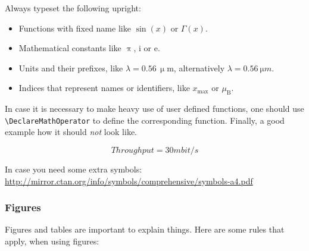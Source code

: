 Always typeset the following upright:

\begin{itemize}
\item Functions with fixed name like $\sin(x)$ or $\Gamma (x)$.
\item Mathematical constants like $\uppi$, $\mathrm{i}$ or $\mathrm{e}$.
\item Units and their prefixes, like $\lambda = 0.56\,\upmu\mathrm{m}$, alternatively $\lambda = \SI{0.56}{\micro m}$.
\item Indices that represent names or identifiers, like $x_\mathrm{max}$ or $\mu_\mathrm B$.
\end{itemize}

In case it is necessary to make heavy use of user defined functions, one should use \texttt{\textbackslash\/DeclareMathOperator} to define the corresponding function. Finally, a good example how it should \emph{not} look like.

\[
Throughput = 30 mbit/s
\]

In case you need some extra symbols: \url{http://mirror.ctan.org/info/symbols/comprehensive/symbols-a4.pdf}

\subsubsection{Figures}

Figures and tables are important to explain things. Here are some rules that apply, when using figures:

